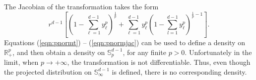   The Jacobian of the transformation takes the form
  \begin{equation}
    \label{eqn:pnormjac}
    r^{d-1}\left[\left(1 - {\textstyle\sum}_{\ell = 1}^{d-1}y_{\ell}^p\right)^{\frac{1}{p}} +
        {\textstyle\sum}_{\ell = 1}^{d-1}y_{\ell}^p\left(1 - {\textstyle\sum}_{l=1}^{d-1} y_{\ell}^p\right)^{\frac{1}{p} - 1}\right].
  \end{equation}
  Equations (\ref{eqn:pnormt}) -- (\ref{eqn:pnormjac}) can be used to define a density on ${\mathbb R}^p_+$, and then obtain a density on ${\mathbb S}_{p}^{d-1}$, for any finite $p>0$. Unfortunately in the limit, when $p\rightarrow +\infty$, the transformation is not differentiable. Thus, even though the projected distribution on ${\mathbb S}_\infty^{d-1}$ is defined, there is no corresponding density.
  
